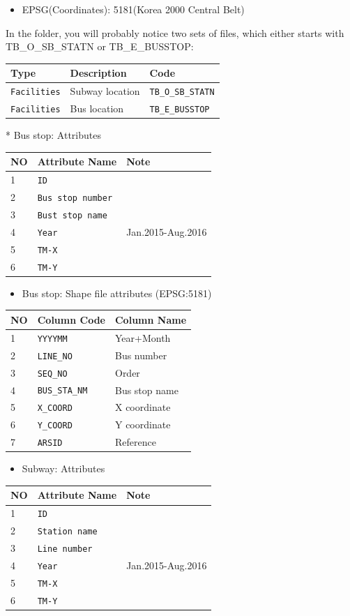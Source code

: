 \documentclass[]{book}
\providecommand{\tightlist}{%
  \setlength{\itemsep}{0pt}\setlength{\parskip}{0pt}}
\theoremstyle{definition}
\theoremstyle{definition}
\theoremstyle{definition}
\theoremstyle{remark}
\begin{document}
\begin{itemize}
\tightlist
\item
  EPSG(Coordinates): 5181(Korea 2000 Central Belt)
\end{itemize}

In the folder, you will probably notice two sets of files, which either
starts with TB\_O\_SB\_STATN or TB\_E\_BUSSTOP:

\begin{longtable}[]{@{}lll@{}}
\toprule
Type & Description & Code\tabularnewline
\midrule
\endhead
\texttt{Facilities} & Subway location &
\texttt{TB\_O\_SB\_STATN}\tabularnewline
\texttt{Facilities} & Bus location &
\texttt{TB\_E\_BUSSTOP}\tabularnewline
\bottomrule
\end{longtable}

 * Bus stop: Attributes

\begin{longtable}[]{@{}lll@{}}
\toprule
NO & Attribute Name & Note\tabularnewline
\midrule
\endhead
1 & \texttt{ID} &\tabularnewline
2 & \texttt{Bus\ stop\ number} &\tabularnewline
3 & \texttt{Bust\ stop\ name} &\tabularnewline
4 & \texttt{Year} & Jan.2015-Aug.2016\tabularnewline
5 & \texttt{TM-X} &\tabularnewline
6 & \texttt{TM-Y} &\tabularnewline
\bottomrule
\end{longtable}

\begin{itemize}
\tightlist
\item
  Bus stop: Shape file attributes (EPSG:5181)
\end{itemize}

\begin{longtable}[]{@{}lll@{}}
\toprule
NO & Column Code & Column Name\tabularnewline
\midrule
\endhead
1 & \texttt{YYYYMM} & Year+Month\tabularnewline
2 & \texttt{LINE\_NO} & Bus number\tabularnewline
3 & \texttt{SEQ\_NO} & Order\tabularnewline
4 & \texttt{BUS\_STA\_NM} & Bus stop name\tabularnewline
5 & \texttt{X\_COORD} & X coordinate\tabularnewline
6 & \texttt{Y\_COORD} & Y coordinate\tabularnewline
7 & \texttt{ARSID} & Reference\tabularnewline
\bottomrule
\end{longtable}

\begin{itemize}
\tightlist
\item
  Subway: Attributes
\end{itemize}

\begin{longtable}[]{@{}lll@{}}
\toprule
NO & Attribute Name & Note\tabularnewline
\midrule
\endhead
1 & \texttt{ID} &\tabularnewline
2 & \texttt{Station\ name} &\tabularnewline
3 & \texttt{Line\ number} &\tabularnewline
4 & \texttt{Year} & Jan.2015-Aug.2016\tabularnewline
5 & \texttt{TM-X} &\tabularnewline
6 & \texttt{TM-Y} &\tabularnewline
\bottomrule
\end{longtable}
\end{document}

